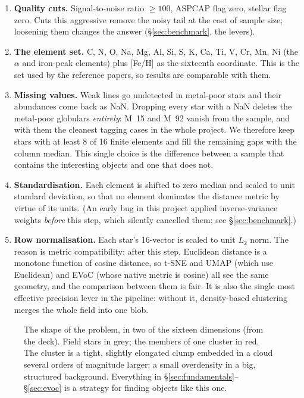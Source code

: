 \begin{enumerate}
\item \textbf{Quality cuts.} Signal-to-noise ratio $\geq 100$, ASPCAP flag
  zero, stellar flag zero. Cuts this aggressive remove the noisy tail at the
  cost of sample size; loosening them changes the answer
  (\S\ref{sec:benchmark}, the levers).
\item \textbf{The element set.} C, N, O, Na, Mg, Al, Si, S, K, Ca, Ti, V, Cr,
Mn, Ni (the $\alpha$ and iron-peak elements) plus $[$Fe/H$]$ as the sixteenth
coordinate. This is the set used by the reference papers, so results are
comparable with them.
\item \textbf{Missing values.} Weak lines go undetected in metal-poor stars and
their abundances come back as NaN. Dropping every star with a NaN deletes the
metal-poor globulars \emph{entirely}: M~15 and M~92 vanish from the sample, and
with them the cleanest tagging cases in the whole project. We therefore keep
stars with at least 8 of 16 finite elements and fill the remaining gaps with
the column median. This single choice is the difference between a sample that
contains the interesting objects and one that does not.
\item \textbf{Standardisation.} Each element is shifted to zero median and
  scaled to unit standard deviation, so that no element dominates the distance
  metric by virtue of its units. (An early bug in this project applied
  inverse-variance weights \emph{before} this step, which silently cancelled
  them; see \S\ref{sec:benchmark}.)
\item \textbf{Row normalisation.} Each star's 16-vector is scaled to unit
  $L_2$ norm. The reason is metric compatibility: after this step, Euclidean
  distance is a monotone function of cosine distance, so t-SNE and UMAP (which
  use Euclidean) and EVoC (whose native metric is cosine) all see the same
  geometry, and the comparison between them is fair. It is also the single
  most effective precision lever in the pipeline: without it, density-based
  clustering merges the whole field into one blob.
\end{enumerate}

\begin{figure}[htbp]\centering
  \caption{The shape of the problem, in two of the sixteen dimensions (from the
  deck). Field stars in grey; the members of one cluster in red. The cluster is
  a tight, slightly elongated clump embedded in a cloud several orders of
  magnitude larger: a small overdensity in a big, structured background.
  Everything in \S\ref{sec:fundamentals}--\S\ref{sec:evoc} is a strategy for
  finding objects like this one.}
  \label{fig:cspace}
\end{figure}

